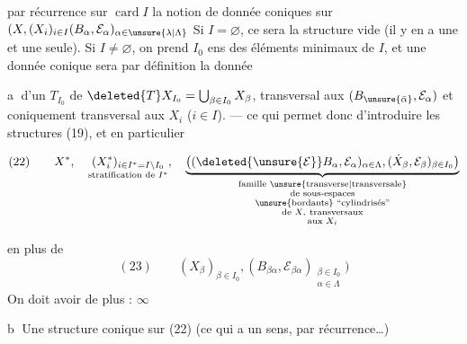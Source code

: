 par récurrence sur $\operatorname{card}I$ la notion de
donnée  coniques sur 
$(X,(X_i)_{i\in I}(B_\alpha,\mathcal E_\alpha)_{\alpha\in\unsure{\lambda|\Lambda}}$
 Si $I=\varnothing$, ce sera la structure
vide (il y en a une et une seule). Si
$I\ne\varnothing$, on prend $I_0$ ens des éléments minimaux
de $I$, et une donnée conique sera par
définition la donnée

\textcircled{a} d'un  $T_{I_0}$
de  $\deleted{T}X_{I_0}=\bigcup_{\beta\in I_0}X_\beta$,
transversal aux $(B_{\unsure{\bar\alpha}},\mathcal E_\alpha)$ et
coniquement transversal aux $X_i$ ($i\in I$).
--- ce qui permet donc d'introduire les
structures (19), et en particulier

\[
(22)\qquad
X^*,\quad
\underset{\text{stratification de }I^*}{(X_i^*)_{i\in I^*=I\setminus I_0}},
\quad
\underbrace{\big((\deleted{\unsure{\mathcal E}}B_\alpha,\mathcal E_\alpha)_{\alpha\in\Lambda},
(\dot X_\beta,\mathcal E_\beta)_{\beta\in I_0}\big)}
_{\substack{\text{famille \unsure{transverse|transversale}}\\\text{de sous-espaces}\\
\text{\unsure{bordants} ``cylindrisés''}\\
\text{de }X,\ \text{transversaux}\\\text{aux }X_i}}
\]

en plus de
\[
(23)\qquad
(X_\beta)_{\beta\in I_0},
(B_{\beta\alpha},\mathcal E_{\beta\alpha})_{\substack{\beta\in I_0\\\alpha\in\Lambda}}\big)
\]
On doit avoir de plus : $\infty$

\textcircled{b} Une structure conique sur (22) (ce qui
a un sens, par récurrence\ldots)
